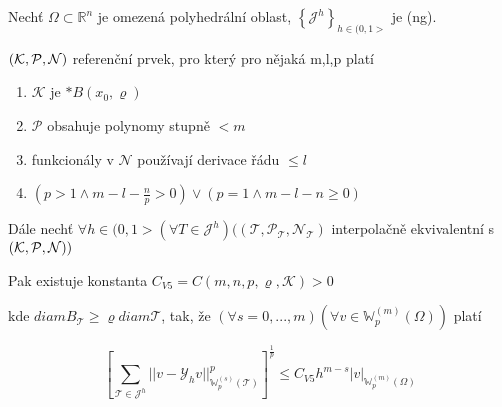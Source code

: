 \documentclass[../main.tex]{subfiles}
\begin{document}
\begin{theorem}[V5]
    Nechť $\Omega\subset\mathbb{R}^n$ je omezená polyhedrální oblast, $\left\{ \mathcal{J}^h \right\}_{h\in(0,1>}$ je (ng).

    $(\mathcal{K}, \mathcal{P}, \mathcal{N})$ referenční prvek, pro který pro nějaká m,l,p platí
    \begin{enumerate}
        \item $\mathcal{K}$ je $*B(x_0,\varrho)$
        \item $\mathcal{P}$ obsahuje polynomy stupně $< m$
        \item funkcionály v $\mathcal{N}$ používají derivace řádu $\leq l$
        \item $(p>1 \wedge m-l-\frac{n}{p} >0) \vee (p=1 \wedge m-l-n \geq 0)$
    \end{enumerate}

    Dále nechť $\forall h \in (0,1> (\forall T \in \mathcal{J}^h ) ( (\mathcal{T}, \mathcal{P}_\mathcal{T}, \mathcal{N}_\mathcal{T})$ interpolačně ekvivalentní s $(\mathcal{K}, \mathcal{P}, \mathcal{N}) )$

    Pak existuje konstanta $C_{V5} = C(m,n,p,\varrho,\mathcal{K}) > 0$

    kde $diam B_\mathcal{T} \geq \varrho diam \mathcal{T}$, tak, že $(\forall s = 0,...,m) (\forall v \in \mathbb{W}_p^{(m)}(\Omega))$ platí

    \begin{equation*}
        \left[  \sum_{\mathcal{T} \in \mathcal{J}^h} ||v - \mathcal{Y}_h v ||^p_{\mathbb{W}_p^{(s)}( \mathcal{T})}   \right]^\frac{1}{p}   \leq C_{V5} h^{m-s} |v|_{\mathbb{W}_p^{(m)} (\Omega) }
    \end{equation*}

\end{theorem}
\end{document}
